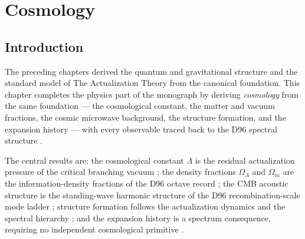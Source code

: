 %
%


\chapter{Cosmology}
\label{c12:chap:cosmology}

\section{Introduction}
\label{c12:sec:cosmology-introduction}

The preceding chapters derived the quantum and gravitational structure and the standard
model of The Actualization Theory from the canonical foundation. This chapter completes the
physics part of the monograph by deriving \emph{cosmology} from the same foundation --- the
cosmological constant, the matter and vacuum fractions, the cosmic microwave background, the
structure formation, and the expansion history --- with every observable traced back to the
D96 spectral structure \cite{c12:QG230,c12:QG234,c12:QG237,c12:QG238}.

The central results are: the cosmological constant $\Lambda$ is the residual actualization
pressure of the critical branching vacuum \cite{c12:QG230}; the density fractions
$\Omega_\Lambda$ and $\Omega_m$ are the information-density fractions of the D96 octave
record \cite{c12:QG234}; the CMB acoustic structure is the standing-wave harmonic structure of
the D96 recombination-scale mode ladder \cite{c12:QG237,c12:QG238}; structure formation follows
the actualization dynamics and the spectral hierarchy \cite{c12:QG231}; and the expansion
history is a spectrum consequence, requiring no independent cosmological primitive
\cite{c12:QG227,c12:QG228,c12:QG240}.

